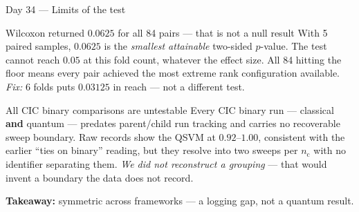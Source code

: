\documentclass[aspectratio=169,11pt]{beamer}
\newcommand{\nc}{\ensuremath{n_{\mathrm{c}}}}
\newcommand{\take}[1]{%
  \vspace{0.4em}\footnotesize\textbf{\color{blue!55!black}Takeaway:} #1}
\newcommand{\daytag}[1]{{\color{blue!55!black}Day #1} --- }
\begin{document}
\begin{frame}{\daytag{34}Limits of the test}
\small
\begin{block}{Wilcoxon returned $0.0625$ for all 84 pairs --- that is not a null result}
With 5 paired samples, $0.0625$ is the \emph{smallest attainable} two-sided
$p$-value. The test cannot reach $0.05$ at this fold count, whatever the effect
size. All 84 hitting the floor means every pair achieved the most extreme rank
configuration available. \emph{Fix:} 6 folds puts $0.03125$ in reach --- not a
different test.
\end{block}

\begin{block}{All CIC binary comparisons are untestable}
Every CIC binary run --- classical \textbf{and} quantum --- predates
parent/child run tracking and carries no recoverable sweep boundary. Raw records
show the QSVM at $0.92$--$1.00$, consistent with the earlier ``ties on binary''
reading, but they resolve into two sweeps per \nc{} with no identifier
separating them. \emph{We did not reconstruct a grouping} --- that would invent
a boundary the data does not record.
\end{block}

\take{symmetric across frameworks --- a logging gap, not a quantum result.}
\end{frame}
\end{document}
